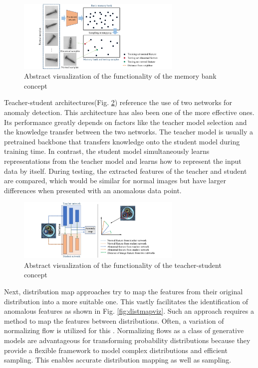 \begin{figure}[H]
\centering
\includegraphics[width=0.7\textwidth]{figures/approachvizgeneral/memorybankviz.jpg}
\caption{Abstract visualization of the functionality of the memory bank concept \cite{liu2024deep}}
\label{fig:memorybankviz}
\end{figure}


Teacher-student architectures(Fig. \ref{fig:TSviz}) \cite{revdist2023} \cite{RudWeh2023AST} reference the use of two networks for anomaly detection. 
This architecture has also been one of the more effective ones. Its performance greatly depends on factors like the teacher model selection and the knowledge transfer between the two networks. The teacher model is usually a pretrained 
backbone that transfers knowledge onto the student model during training time. In contrast, the student model simultaneously learns representations from the teacher model and learns 
how to represent the input data by itself. During testing, the extracted features of the teacher and student are compared, which would be similar for normal images but have larger differences 
when presented with an anomalous data point.\newline


\begin{figure}[H]
\centering
\includegraphics[width=0.7\textwidth]{figures/approachvizgeneral/TSviz.jpg}
\caption{Abstract visualization of the functionality of the teacher-student concept \cite{liu2024deep}}
\label{fig:TSviz}
\end{figure}



Next, distribution map approaches \cite{csflow2022} try to map the features from their original distribution into a more suitable one. This vastly facilitates the identification of anomalous features as shown in 
Fig. \ref{fig:distmapviz}. Such an approach requires a method to map the features between distributions. Often, a variation of normalizing flow is utilized for this \cite{liu2024deep}. 
Normalizing flows as a class of generative models \cite{Kobyzev_2021normalizingflowexplanation} are advantageous for transforming probability distributions because they provide a flexible 
framework to model complex distributions and efficient sampling. This enables accurate distribution mapping as well as sampling. \newline


